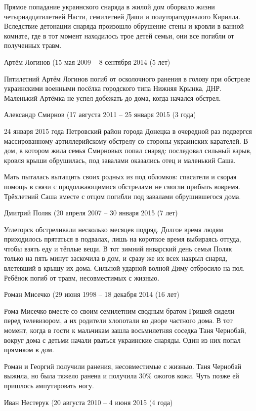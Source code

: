 Прямое попадание украинского снаряда в жилой дом оборвало жизни
четырнадцатилетней Насти, семилетней Даши и полуторагодовалого Кирилла.
Вследствие детонации снаряда произошло обрушение стены и кровли в ванной
комнате, где в тот момент находилось трое детей семьи, они все погибли от
полученных травм.

Артём Логинов (15 мая 2009 – 8 сентября 2014 (5 лет)

Пятилетний Артём Логинов погиб от осколочного ранения в голову при обстреле
украинскими военными посёлка городского типа Нижняя Крынка, ДНР. Маленький
Артёмка не успел добежать до дома, когда начался обстрел.

Александр Смирнов (17 августа 2011 – 25 января 2015 (3 года)

24 января 2015 года Петровский район города Донецка в очередной раз подвергся
массированному артиллерийскому обстрелу со стороны украинских карателей. В дом,
в котором жила семья Смирновых попал снаряд: последовал сильный взрыв, кровля
крыши обрушилась, под завалами оказались отец и маленький Саша.

Мать пыталась вытащить своих родных из под обломков: спасатели и скорая помощь
в связи с продолжающимися обстрелами не смогли прибыть вовремя. Трёхлетний Саша
вместе с отцом погибли под завалами обрушившегося дома.

Дмитрий Поляк (20 апреля 2007 – 30 января 2015 (7 лет)

Углегорск обстреливали несколько месяцев подряд. Долгое время людям приходилось
прятаться в подвалах, лишь на короткое время выбираясь оттуда, чтобы взять еду
и тёплые вещи. В тот зимний январский день семья Поляк только на пять минут
заскочила в дом, и сразу же их всех накрыл снаряд, влетевший в крышу их дома.
Сильной ударной волной Диму отбросило на пол. Ребёнок погиб от травм,
несовместимых с жизнью.

Роман Мисечко (29 июня 1998 – 18 декабря 2014 (16 лет)

Рома Мисечко вместе со своим семилетним сводным братом Гришей сидели перед
телевизором, а их родители хлопотали во дворе частного дома. В тот момент,
когда в гости к мальчикам зашла восьмилетняя соседка Таня Чернобай, вокруг дома
с детьми начали рваться украинские снаряды. Один из них попал прямиком в дом.

Роман и Георгий получили ранения, несовместимые с жизнью. Таня Чернобай выжила,
но была тяжело ранена и получила 30\% ожогов кожи. Чуть позже ей пришлось
ампутировать ногу.

Иван Нестерук (20 августа 2010 – 4 июня 2015 (4 года)

